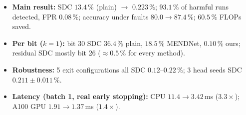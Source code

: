 \documentclass[10pt,a4paper]{article}
\begin{document}
\begin{itemize}
  \item \textbf{Main result:} SDC $13.4\,\%$ (plain) $\to$ $\mathbf{0.223\,\%}$; $93.1\,\%$ of harmful runs
        detected, FPR $0.08\,\%$; accuracy under faults $80.0 \to 87.4\,\%$; $60.5\,\%$ FLOPs saved.
  \item \textbf{Per bit ($k=1$):} bit 30 SDC $36.4\,\%$ plain, $18.5\,\%$ MENDNet, $\mathbf{0.10\,\%}$ ours;
        residual SDC mostly bit 26 ($\approx0.5\,\%$ for every method).
  \item \textbf{Robustness:} 5 exit configurations all SDC $0.12$--$0.22\,\%$; 3 head seeds SDC
        $0.211\pm0.011\,\%$.
  \item \textbf{Latency (batch 1, real early stopping):} CPU $11.4 \to 3.42$\,ms ($3.3\times$);
        A100 GPU $1.91 \to 1.37$\,ms ($1.4\times$).
 
\end{itemize}
\end{document}

